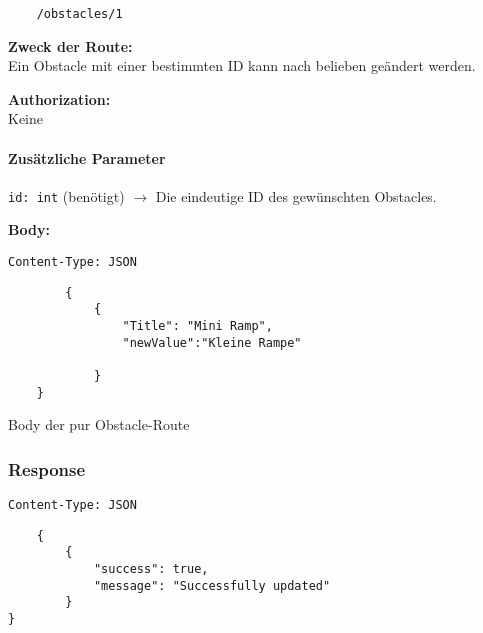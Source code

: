 \begin{lstlisting}
    /obstacles/1
\end{lstlisting}

\textbf{Zweck der Route:} \\
Ein Obstacle mit einer bestimmten ID kann nach belieben geändert werden.

\textbf{Authorization:} \\
Keine

\paragraph{Zusätzliche Parameter}
\lstinline{id: int} (benötigt)
$\rightarrow$ Die eindeutige ID des gewünschten Obstacles.

\textbf{Body:}\\
\begin{code}
    \lstinline{Content-Type: JSON}
    \begin{lstlisting}
        {
            {
                "Title": "Mini Ramp",
                "newValue":"Kleine Rampe"
    
            }
    }
    \end{lstlisting}
    \caption{Body der pur Obstacle-Route}
\end{code}

\subsubsection{Response}

\lstinline{Content-Type: JSON}
\begin{lstlisting}
    {
        {
            "success": true,
            "message": "Successfully updated"
        }
}
\end{lstlisting}

\pagebreak

